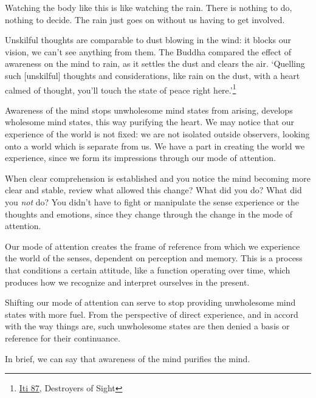 \enlargethispage*{\baselineskip}

Watching the body like this is like watching the rain. There is nothing
to do, nothing to decide. The rain just goes on without us having to get
involved.

\clearpage

\vspace*{-\baselineskip}


Unskilful thoughts are comparable to dust blowing in the wind: it blocks
our vision, we can't see anything from them. The Buddha compared the
effect of awareness on the mind to rain, as it settles the dust and
clears the air. `Quelling such {[}unskilful{]} thoughts and
considerations, like rain on the dust, with a heart calmed of thought,
you'll touch the state of peace right here.'\footnote{\href{https://suttacentral.net/iti87/en/sujato}{Iti
  87}, Destroyers of Sight}

Awareness of the mind stops unwholesome mind states from arising,
develops wholesome mind states, this way purifying the heart. We may
notice that our experience of the world is not fixed: we are not
isolated outside observers, looking onto a world which is separate from
us. We have a part in creating the world we experience, since we form
its impressions through our mode of attention.

When clear comprehension is established and you notice the mind becoming
more clear and stable, review what allowed this change? What did you do?
What did you \emph{not} do? You didn't have to fight or manipulate the
sense experience or the thoughts and emotions, since they change through
the change in the mode of attention.

Our mode of attention creates the frame of reference from which we
experience the world of the senses, dependent on perception and memory.
This is a process that conditions a certain attitude, like a function
operating over time, which produces how we recognize and interpret
ourselves in the present.

Shifting our mode of attention can serve to stop providing unwholesome
mind states with more fuel. From the perspective of direct experience,
and in accord with the way things are, such unwholesome states are then
denied a basis or reference for their continuance.

In brief, we can say that awareness of the mind purifies the mind.

